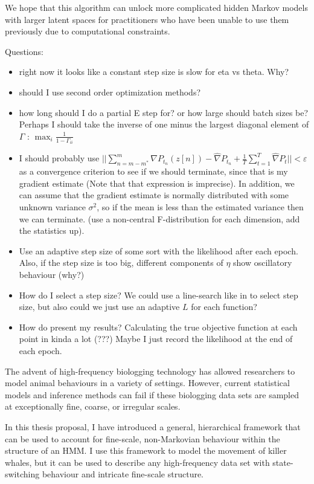 We hope that this algorithm can unlock more complicated hidden Markov models with larger latent spaces for practitioners who have been unable to use them previously due to computational constraints.

\iffalse

Questions:

\begin{itemize}
    \item right now it looks like a constant step size is slow for eta vs theta. Why?
    \item should I use second order optimization methods?
    \item how long should I do a partial E step for? or how large should batch sizes be? Perhaps I should take the inverse of one minus the largest diagonal element of $\Gamma$ : $\max_i \frac{1}{1-\Gamma_{ii}}$
    \item I should probably use $||\sum_{n=m-m^*}^{m} \nabla P_{t_n}(z[n]) - \widehat \nabla P_{t_n} + \frac{1}{T} \sum_{t=1}^T \widehat \nabla P_t|| < \varepsilon$ as a convergence criterion to see if we should terminate, since that is my gradient estimate (Note that that expression is imprecise). In addition, we can assume that the gradient estimate is normally distributed with some unknown variance $\sigma^2$, so if the mean is less than the estimated variance then we can terminate. (use a non-central F-distribution for each dimension, add the statistics up).
    \item Use an adaptive step size of some sort with the likelihood after each epoch. Also, if the step size is too big, different components of $\eta$ show oscillatory behaviour (why?)
    \item How do I select a step size? We could use a line-search like in \citep{Schmidt:2017} to select step size, but also could we just use an adaptive $L$ for each function?  
    \item How do present my results? Calculating the true objective function at each point in kinda a lot (???) Maybe I just record the likelihood at the end of each epoch.
\end{itemize}

The advent of high-frequency biologging technology has allowed researchers to model animal behaviours in a variety of settings. However, current statistical models and inference methods can fail if these biologging data sets are sampled at exceptionally fine, coarse, or irregular scales.

In this thesis proposal, I have introduced a general, hierarchical framework that can be used to account for fine-scale, non-Markovian behaviour within the structure of an HMM. I use this framework to model the movement of killer whales, but it can be used to describe any high-frequency data set with state-switching behaviour and intricate fine-scale structure. 

